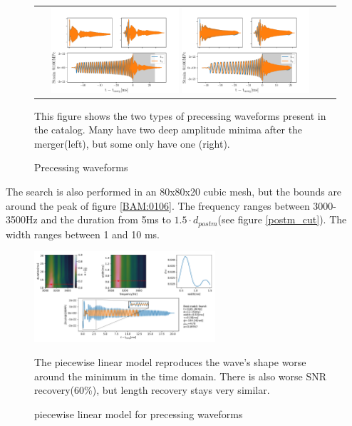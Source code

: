 \begin{figure}[hbt!]
\begin{center}
\begin{tabular}{cc}
\includegraphics[width=0.45\textwidth, angle=0]{images/Data_analysis/results/d_postm_chi.pdf}

\includegraphics[width=0.45\textwidth, angle=0]{images/Data_analysis/results/d_postm_chi1.pdf}
\end{tabular}
\end{center}
\caption{Precessing waveforms}
This figure shows the two types of precessing waveforms present in the catalog. Many have two deep amplitude minima after the merger(left), but some only have one (right).
\end{figure}

\FloatBarrier





The search is also performed in an 80x80x20 cubic mesh, but the bounds are around the peak of figure \ref{BAM:0106}. The frequency ranges between 3000-3500Hz and the duration from 5ms to $1.5\cdot d_{postm}$(see figure \ref{postm_cut}). The width ranges between 1 and 10 ms.

\begin{figure}[hbt!]
\begin{center}
\includegraphics[width=0.6\textwidth, angle=0]{images/Data_analysis/results/envel_110_lin.pdf}
\caption{piecewise linear model for precessing waveforms}
\end{center}
The piecewise linear model reproduces the wave's shape worse around the minimum in the time domain. There is also worse SNR recovery(60\%), but length recovery stays very similar.
\end{figure}

